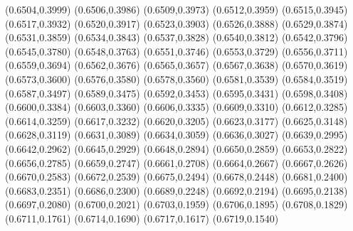 \PST@Filltriangle(0.6504,0.3999)
\PST@Filltriangle(0.6506,0.3986)
\PST@Filltriangle(0.6509,0.3973)
\PST@Filltriangle(0.6512,0.3959)
\PST@Filltriangle(0.6515,0.3945)
\PST@Filltriangle(0.6517,0.3932)
\PST@Filltriangle(0.6520,0.3917)
\PST@Filltriangle(0.6523,0.3903)
\PST@Filltriangle(0.6526,0.3888)
\PST@Filltriangle(0.6529,0.3874)
\PST@Filltriangle(0.6531,0.3859)
\PST@Filltriangle(0.6534,0.3843)
\PST@Filltriangle(0.6537,0.3828)
\PST@Filltriangle(0.6540,0.3812)
\PST@Filltriangle(0.6542,0.3796)
\PST@Filltriangle(0.6545,0.3780)
\PST@Filltriangle(0.6548,0.3763)
\PST@Filltriangle(0.6551,0.3746)
\PST@Filltriangle(0.6553,0.3729)
\PST@Filltriangle(0.6556,0.3711)
\PST@Filltriangle(0.6559,0.3694)
\PST@Filltriangle(0.6562,0.3676)
\PST@Filltriangle(0.6565,0.3657)
\PST@Filltriangle(0.6567,0.3638)
\PST@Filltriangle(0.6570,0.3619)
\PST@Filltriangle(0.6573,0.3600)
\PST@Filltriangle(0.6576,0.3580)
\PST@Filltriangle(0.6578,0.3560)
\PST@Filltriangle(0.6581,0.3539)
\PST@Filltriangle(0.6584,0.3519)
\PST@Filltriangle(0.6587,0.3497)
\PST@Filltriangle(0.6589,0.3475)
\PST@Filltriangle(0.6592,0.3453)
\PST@Filltriangle(0.6595,0.3431)
\PST@Filltriangle(0.6598,0.3408)
\PST@Filltriangle(0.6600,0.3384)
\PST@Filltriangle(0.6603,0.3360)
\PST@Filltriangle(0.6606,0.3335)
\PST@Filltriangle(0.6609,0.3310)
\PST@Filltriangle(0.6612,0.3285)
\PST@Filltriangle(0.6614,0.3259)
\PST@Filltriangle(0.6617,0.3232)
\PST@Filltriangle(0.6620,0.3205)
\PST@Filltriangle(0.6623,0.3177)
\PST@Filltriangle(0.6625,0.3148)
\PST@Filltriangle(0.6628,0.3119)
\PST@Filltriangle(0.6631,0.3089)
\PST@Filltriangle(0.6634,0.3059)
\PST@Filltriangle(0.6636,0.3027)
\PST@Filltriangle(0.6639,0.2995)
\PST@Filltriangle(0.6642,0.2962)
\PST@Filltriangle(0.6645,0.2929)
\PST@Filltriangle(0.6648,0.2894)
\PST@Filltriangle(0.6650,0.2859)
\PST@Filltriangle(0.6653,0.2822)
\PST@Filltriangle(0.6656,0.2785)
\PST@Filltriangle(0.6659,0.2747)
\PST@Filltriangle(0.6661,0.2708)
\PST@Filltriangle(0.6664,0.2667)
\PST@Filltriangle(0.6667,0.2626)
\PST@Filltriangle(0.6670,0.2583)
\PST@Filltriangle(0.6672,0.2539)
\PST@Filltriangle(0.6675,0.2494)
\PST@Filltriangle(0.6678,0.2448)
\PST@Filltriangle(0.6681,0.2400)
\PST@Filltriangle(0.6683,0.2351)
\PST@Filltriangle(0.6686,0.2300)
\PST@Filltriangle(0.6689,0.2248)
\PST@Filltriangle(0.6692,0.2194)
\PST@Filltriangle(0.6695,0.2138)
\PST@Filltriangle(0.6697,0.2080)
\PST@Filltriangle(0.6700,0.2021)
\PST@Filltriangle(0.6703,0.1959)
\PST@Filltriangle(0.6706,0.1895)
\PST@Filltriangle(0.6708,0.1829)
\PST@Filltriangle(0.6711,0.1761)
\PST@Filltriangle(0.6714,0.1690)
\PST@Filltriangle(0.6717,0.1617)
\PST@Filltriangle(0.6719,0.1540)
